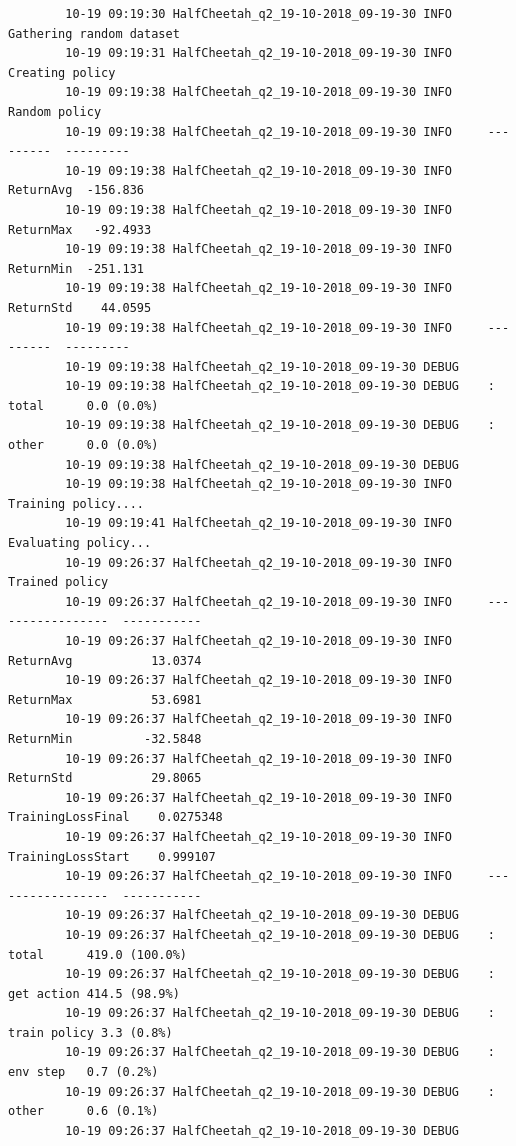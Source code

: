 \documentclass[12pt]{article}
\begin{document}
	\begin{lstlisting}
		10-19 09:19:30 HalfCheetah_q2_19-10-2018_09-19-30 INFO     Gathering random dataset
		10-19 09:19:31 HalfCheetah_q2_19-10-2018_09-19-30 INFO     Creating policy
		10-19 09:19:38 HalfCheetah_q2_19-10-2018_09-19-30 INFO     Random policy
		10-19 09:19:38 HalfCheetah_q2_19-10-2018_09-19-30 INFO     ---------  ---------
		10-19 09:19:38 HalfCheetah_q2_19-10-2018_09-19-30 INFO     ReturnAvg  -156.836
		10-19 09:19:38 HalfCheetah_q2_19-10-2018_09-19-30 INFO     ReturnMax   -92.4933
		10-19 09:19:38 HalfCheetah_q2_19-10-2018_09-19-30 INFO     ReturnMin  -251.131
		10-19 09:19:38 HalfCheetah_q2_19-10-2018_09-19-30 INFO     ReturnStd    44.0595
		10-19 09:19:38 HalfCheetah_q2_19-10-2018_09-19-30 INFO     ---------  ---------
		10-19 09:19:38 HalfCheetah_q2_19-10-2018_09-19-30 DEBUG    
		10-19 09:19:38 HalfCheetah_q2_19-10-2018_09-19-30 DEBUG    : total      0.0 (0.0%)
		10-19 09:19:38 HalfCheetah_q2_19-10-2018_09-19-30 DEBUG    : other      0.0 (0.0%)
		10-19 09:19:38 HalfCheetah_q2_19-10-2018_09-19-30 DEBUG    
		10-19 09:19:38 HalfCheetah_q2_19-10-2018_09-19-30 INFO     Training policy....
		10-19 09:19:41 HalfCheetah_q2_19-10-2018_09-19-30 INFO     Evaluating policy...
		10-19 09:26:37 HalfCheetah_q2_19-10-2018_09-19-30 INFO     Trained policy
		10-19 09:26:37 HalfCheetah_q2_19-10-2018_09-19-30 INFO     -----------------  -----------
		10-19 09:26:37 HalfCheetah_q2_19-10-2018_09-19-30 INFO     ReturnAvg           13.0374
		10-19 09:26:37 HalfCheetah_q2_19-10-2018_09-19-30 INFO     ReturnMax           53.6981
		10-19 09:26:37 HalfCheetah_q2_19-10-2018_09-19-30 INFO     ReturnMin          -32.5848
		10-19 09:26:37 HalfCheetah_q2_19-10-2018_09-19-30 INFO     ReturnStd           29.8065
		10-19 09:26:37 HalfCheetah_q2_19-10-2018_09-19-30 INFO     TrainingLossFinal    0.0275348
		10-19 09:26:37 HalfCheetah_q2_19-10-2018_09-19-30 INFO     TrainingLossStart    0.999107
		10-19 09:26:37 HalfCheetah_q2_19-10-2018_09-19-30 INFO     -----------------  -----------
		10-19 09:26:37 HalfCheetah_q2_19-10-2018_09-19-30 DEBUG    
		10-19 09:26:37 HalfCheetah_q2_19-10-2018_09-19-30 DEBUG    : total      419.0 (100.0%)
		10-19 09:26:37 HalfCheetah_q2_19-10-2018_09-19-30 DEBUG    : get action 414.5 (98.9%)
		10-19 09:26:37 HalfCheetah_q2_19-10-2018_09-19-30 DEBUG    : train policy 3.3 (0.8%)
		10-19 09:26:37 HalfCheetah_q2_19-10-2018_09-19-30 DEBUG    : env step   0.7 (0.2%)
		10-19 09:26:37 HalfCheetah_q2_19-10-2018_09-19-30 DEBUG    : other      0.6 (0.1%)
		10-19 09:26:37 HalfCheetah_q2_19-10-2018_09-19-30 DEBUG    
		
	\end{lstlisting}
	
\end{document}
